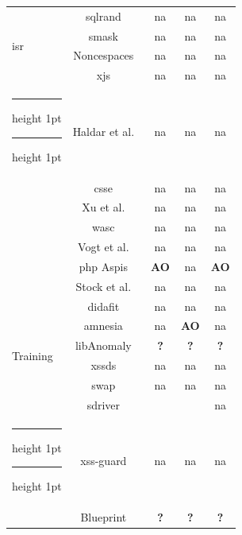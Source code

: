 \documentclass[10pt,journal,compsoc]{IEEEtran}
\makeatletter
\newcommand{\tick}{\ding{52}}
\newcommand{\thickhline}{%
    \noalign {\ifnum 0=`}\fi \hrule height 1pt
    \futurelet \reserved@a \@xhline
}
\makeatother
\begin{document}
\begin{table}
\begin{threeparttable}
\begin{small}
{\begin{tabular}{l|c|ccc}
  \hline
  \multirow{4}{*}{{\sc isr}}
  &   {\sc sql}rand~\cite{BK04} & {\sc na} & {\sc na} & {\sc na} \\
  &   {\sc sm}ask~\cite{JB07} & {\sc na} & {\sc na} & {\sc na} \\
  &   Noncespaces~\cite{GC09} & {\sc na} & {\sc na} & {\sc na} \\
  &   x{\sc js}~\cite{APKLM10} & {\sc na} & {\sc na} & {\sc na} \\
  \thickhline
  \thickhline
  \multirow{7}{*}{Taint Tracking}
  &   Haldar et al.~\cite{HCF05}  & {\sc na} & {\sc na} & {\sc na} \\
  &   {\sc csse}~\cite{PB05} & {\sc na} & {\sc na} & {\sc na} \\
  &   Xu et al.~\cite{XBS06}  & {\sc na} & {\sc na} & {\sc na} \\
  &   {\sc wasc}~\cite{NLC07} & {\sc na} & {\sc na} & {\sc na} \\
  &   Vogt et al.~\cite{VFJKKV07}  & {\sc na} & {\sc na} & {\sc na} \\
  &   {\sc php} Aspis~\cite{PMP11} & {\bf AO} & {\sc na} & {\bf AO} \\
  &   Stock et al.~\cite{SLMS14} & {\sc na} & {\sc na} & {\sc na} \\
  \hline
  \multirow{6}{*}{Training}
  &   {\sc didafit}~\cite{LLW02} & {\sc na} & {\sc na} & {\sc na} \\
  &   {\sc amnesia}~\cite{HO05b} & {\sc na} & {\bf AO} & {\sc na} \\
  &   libAnomaly~\cite{VMV05} & {\bf ?} & {\bf ?} & {\bf ?} \\
  &   {\sc xssds}~\cite{JEP08} & {\sc na} & {\sc na} & {\sc na} \\
  &   {\sc swap}~\cite{WPLKK09} & {\sc na} & {\sc na} & {\sc na} \\
  &   {\sc sd}river~\cite{MS09,MKLS11} & \tick & \tick & {\sc na} \\
  \thickhline
  \thickhline
  \multirow{9}{*}{Hybrid}
  &   {\sc xss-guard}~\cite{BV08} & {\sc na} & {\sc na} & {\sc na} \\
  &   Blueprint~\cite{LV09} & {\bf ?} & {\bf ?} & {\bf ?} \\

\end{tabular}}
\end{small}
\end{threeparttable}
\end{table}
\end{document}
